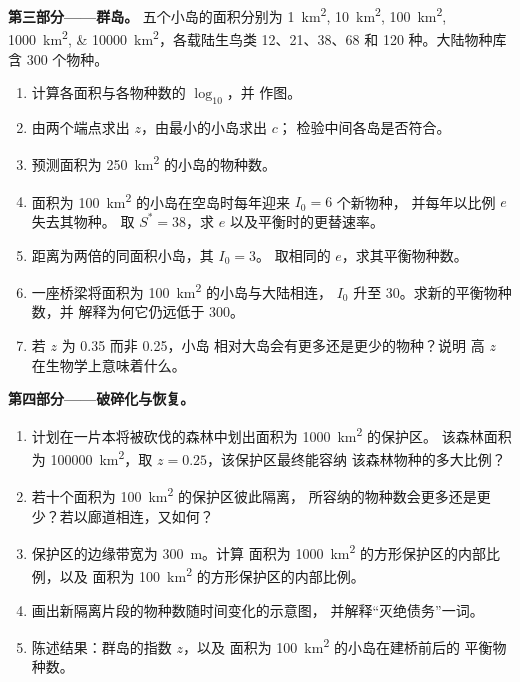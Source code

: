 \begin{problem}
\medskip
\noindent\textbf{第三部分——群岛。}
五个小岛的面积分别为 \qtylist{1;10;100;1000;10000}{km^2}，各载陆生鸟类 \num{12}、\num{21}、\num{38}、\num{68} 和
\num{120} 种。大陆物种库含 \num{300}
个物种。
\begin{enumerate}[resume]
  \item 计算各面积与各物种数的 $\log_{10}$，并
        作图。
  \item 由两个端点求出 $z$，由最小的小岛求出 $c$；
        检验中间各岛是否符合。
  \item 预测面积为 \qty{250}{km^2} 的小岛的物种数。
  \item 面积为 \qty{100}{km^2} 的小岛在空岛时每年迎来 $I_0 = 6$ 个新物种，
        并每年以比例 $e$ 失去其物种。
        取 $S^* = 38$，求 $e$ 以及平衡时的更替速率。
  \item 距离为两倍的同面积小岛，其 $I_0 = 3$。
        取相同的 $e$，求其平衡物种数。
  \item 一座桥梁将面积为 \qty{100}{km^2} 的小岛与大陆相连，
        $I_0$ 升至 \num{30}。求新的平衡物种数，并
        解释为何它仍远低于 \num{300}。
  \item 若 $z$ 为 \num{0.35} 而非 \num{0.25}，小岛
        相对大岛会有更多还是更少的物种？说明
        高 $z$ 在生物学上意味着什么。
\end{enumerate}

\medskip
\noindent\textbf{第四部分——破碎化与恢复。}
\begin{enumerate}[resume]
  \item 计划在一片本将被砍伐的森林中划出面积为 \qty{1000}{km^2} 的保护区。
        该森林面积为 \qty{100000}{km^2}，取 $z =
        0.25$，该保护区最终能容纳
        该森林物种的多大比例？
  \item 若十个面积为 \qty{100}{km^2} 的保护区彼此隔离，
        所容纳的物种数会更多还是更少？若以廊道相连，又如何？
  \item 保护区的边缘带宽为 \qty{300}{m}。计算
        面积为 \qty{1000}{km^2} 的方形保护区的内部比例，以及
        面积为 \qty{100}{km^2} 的方形保护区的内部比例。
  \item 画出新隔离片段的物种数随时间变化的示意图，
        并解释“灭绝债务”一词。
  \item 陈述结果：群岛的指数 $z$，以及
        面积为 \qty{100}{km^2} 的小岛在建桥前后的
        平衡物种数。
\end{enumerate}
\end{problem}
